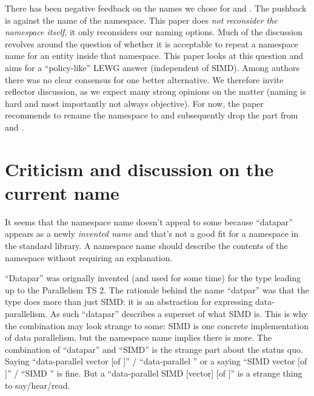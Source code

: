 \begin{wgTitlepage}
  There has been negative feedback on the names we chose for \stddatapar\simd and \stddatapar\mask.
  The pushback is against the name of the namespace.
  This paper does \emph{not reconsider the namespace itself}, it only reconsiders our naming
  options.
  Much of the discussion revolves around the question of whether it is acceptable to repeat a
  namespace name for an entity inside that namespace.
  This paper looks at this question and aims for a “policy-like” LEWG answer (independent of SIMD).
  Among authors there was no clear consensus for one better alternative.
  We therefore invite reflector discussion, as we expect many strong opinions on the matter (naming
  is hard and most importantly not always objective).
  For now, the paper recommends to rename the namespace to  and subsequently drop the
   part from  and .
\end{wgTitlepage}

\pagestyle{scrheadings}




\section{Criticism and discussion on the current name}\label{sec:criticism}
It seems that the namespace name  doesn't appeal to some because “datapar” appears
as a newly \emph{invented name} and that's not a good fit for a namespace in the standard library.
A namespace name should describe the contents of the namespace without requiring an explanation.

“Datapar” was orignally invented (and used for some time) for the  type leading up to
the Parallelism TS 2.
The rationale behind the name “datpar” was that the  type does more than just SIMD: it
is an abstraction for expressing data-parallelism.
As such “datapar” describes a superset of what SIMD is.
This is why the combination  may look strange to some:
SIMD is one concrete implementation of data parallelism, but the namespace name implies there is
more.
The combination of “datapar” and “SIMD” is the strange part about the status quo.
Saying “data-parallel vector [of ]” / “data-parallel ” or a saying “SIMD vector
[of ]” / “SIMD ” is fine.
But a “data-parallel SIMD [vector] [of ]” is a strange thing to say/hear/read.

